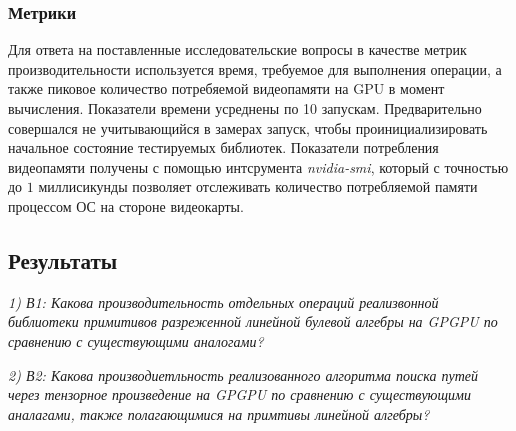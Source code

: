 \subsubsection*{Метрики}

Для ответа на поставленные исследовательские вопросы в качестве метрик производительности используется время, требуемое для выполнения операции, а также пиковое количество потребяемой видеопамяти на GPU в момент вычисления. Показатели времени усреднены по 10 запускам. Предварительно совершался не учитывающийся в замерах запуск, чтобы проинициализировать начальное состояние тестируемых библиотек. Показатели потребления видеопамяти получены с помощью интсрумента \textit{nvidia-smi}, который с точностью до $1$ миллисикунды позволяет отслеживать количество потребляемой памяти процессом ОС на стороне видеокарты. 

\subsection{Результаты}

\textit{1) В1: Какова производительность отдельных операций реализвонной библиотеки примитивов разреженной линейной булевой алгебры на GPGPU по сравнению с существующими аналогами?}

\textit{2) В2: Какова производиетльность реализованного алгоритма поиска путей через тензорное произведение на GPGPU по сравнению с существующими аналагами, также полагающимися на примтивы линейной алгебры?}